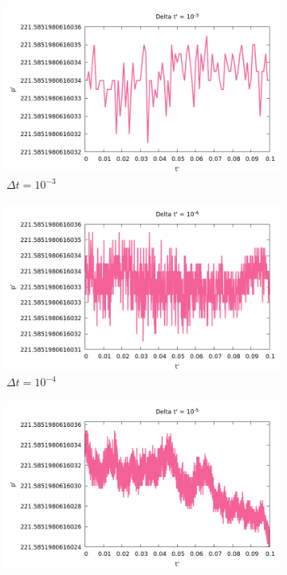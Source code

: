 \documentclass[a4paper,10pt]{article}
\begin{document}
\begin{figure}[h]
	\centering
	\begin{subfigure}{0.3\linewidth}
		\includegraphics[width=\linewidth]{momentum_euler_1}
		\caption{$\Delta t = 10^{-3}$}
		\label{fig:momentumeuler1}
	\end{subfigure}
	\begin{subfigure}{0.3\linewidth}
		\includegraphics[width=\linewidth]{momentum_euler_2}
		\caption{$\Delta t = 10^{-4}$}
		\label{fig:momentumeuler2}
	\end{subfigure}
	\begin{subfigure}{0.3\linewidth}
		\includegraphics[width=\linewidth]{momentum_euler_3} 

\end{subfigure}
\end{figure}
\end{document}
